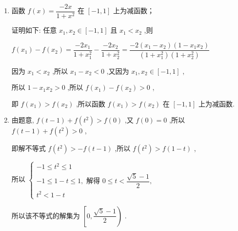 \begin{enumerate}
\begin{jieda}
\begin{enumerate}
            $f\left( {-x}\right)  =  - f\left( x\right) ;\dfrac{-{ax} - b}{1 + {x}^{2}} =  - \dfrac{{ax} - b}{1 + {x}^{2}}$ ,解得 $b = 0$ ,
            
            $\therefore f\left( x\right)  = \dfrac{ax}{1 + {x}^{2}}$ ,而 $f\left( 1\right)  =  - 1$ ,解得 $a =  - 2$ ,
            
            $\therefore f\left( x\right)  = \dfrac{-{2x}}{1 + {x}^{2}},x \in  \left\lbrack  {-1,1}\right\rbrack$ .
            \item 函数 $f\left( x\right)  = \dfrac{-{2x}}{1 + {x}^{2}}$ 在 $\left\lbrack  {-1,1}\right\rbrack$ 上为减函数；
            
            证明如下: 任意 ${x}_{1},{x}_{2} \in  \left\lbrack  {-1,1}\right\rbrack$ 且 ${x}_{1} < {x}_{2}$ ,则
            
            $f\left( {x}_{1}\right)  - f\left( {x}_{2}\right)  = \dfrac{-2{x}_{1}}{1 + {x}_{1}^{2}} - \dfrac{-2{x}_{2}}{1 + {x}_{2}^{2}} = \dfrac{-2\left( {{x}_{1} - {x}_{2}}\right) \left( {1 - {x}_{1}{x}_{2}}\right) }{\left( {1 + {x}_{1}^{2}}\right) \left( {1 + {x}_{2}^{2}}\right) }$
            
            因为 ${x}_{1} < {x}_{2}$ ,所以 ${x}_{1} - {x}_{2} < 0$ ,又因为 ${x}_{1},{x}_{2} \in  \left\lbrack  {-1,1}\right\rbrack$ ,
            
            所以 $1 - {x}_{1}{x}_{2} > 0$ ,所以 $f\left( {x}_{1}\right)  - f\left( {x}_{2}\right)  > 0$ ,
            
            即 $f\left( {x}_{1}\right)  > f\left( {x}_{2}\right)$ ,所以函数 $f\left( {x}_{1}\right)  > f\left( {x}_{2}\right)$ 在 $\left\lbrack  {-1,1}\right\rbrack$ 上为减函数.

            \item 由题意, $f\left( {t - 1}\right)  + f\left( {t}^{2}\right)  > f\left( 0\right)$ ,又 $f\left( 0\right)  = 0$ ,所以 $f\left( {t - 1}\right)  + f\left( {t}^{2}\right)  > 0$ ,
            
            即解不等式 $f\left( {t}^{2}\right)  >  - f\left( {t - 1}\right)$ ,所以 $f\left( {t}^{2}\right)  > f\left( {1 - t}\right)$ ,
            
            所以 $\left\{  \begin{array}{l}  - 1 \leq  {t}^{2} \leq  1 \\   - 1 \leq  1 - t \leq  1,\text{ 解得 }0 \leq  t < \dfrac{\sqrt{5} - 1}{2}, \\  {t}^{2} < 1 - t \end{array}\right.$
            
            所以该不等式的解集为 $\left\lbrack  {0,\dfrac{\sqrt{5} - 1}{2}}\right)$ .
        \end{enumerate}
    \end{jieda}
\end{enumerate}
\clearpage
